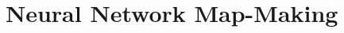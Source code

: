 \documentclass[../../thesis.tex]{subfiles}
\begin{document}
\chapter{Neural Network Map-Making} \label{chap:NNMM}
\ifSubfilesClassLoaded{
    \tableofcontents
}{
    \minitoc
}
\end{document}
